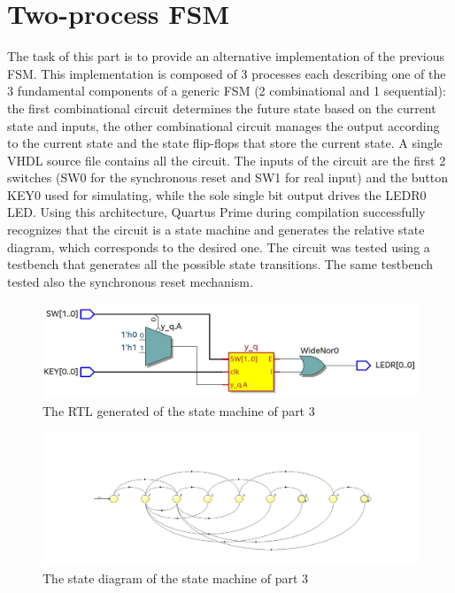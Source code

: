 \documentclass[12pt]{article}
\begin{document}
\section{Two-process FSM}
The task of this part is to provide an alternative implementation of the previous FSM. This implementation is composed of 3 processes each describing one of the 3 fundamental components of a generic FSM (2 combinational and 1 sequential): the first combinational circuit determines the future state based on the current state and inputs, the other combinational circuit manages the output according to the current state and the state flip-flops that store the current state. \newline
A single VHDL source file contains all the circuit. The inputs of the circuit are the first 2 switches (SW0 for the synchronous reset and SW1 for real input) and the button KEY0 used for simulating, while the sole single bit output drives the LEDR0 LED.
Using this architecture, Quartus Prime during compilation successfully recognizes that the circuit is a state machine and generates the relative state diagram, which corresponds to the desired one. \newline
The circuit was tested using a testbench that generates all the possible state transitions. The same testbench tested also the synchronous reset mechanism.
\begin{figure}[h]
	\centering
	\includegraphics[scale = 0.45]{immagini/AndreaMattei/RTL5_3.jpg}
	\caption{The RTL generated of the state machine of part 3}
\end{figure}
\begin{figure}[h]
	\centering
	\includegraphics[scale = 0.4]{immagini/AndreaMattei/state_machine_5_3.jpg}
	\caption{The state diagram of the state machine of part 3}
\end{figure}
\newpage
\end{document}
